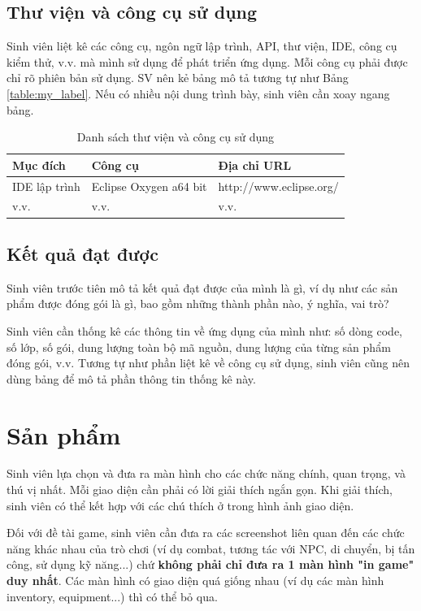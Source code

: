 \documentclass[../DoAn.tex]{subfiles}
\begin{document}
\subsection{Thư viện và công cụ sử dụng}
Sinh viên liệt kê các công cụ, ngôn ngữ lập trình, API, thư viện, IDE, công cụ kiểm thử, v.v. mà mình sử dụng để phát triển ứng dụng. Mỗi công cụ phải được chỉ rõ phiên bản sử dụng. SV nên kẻ bảng mô tả tương tự như Bảng \ref{table:my_label}. Nếu có nhiều nội dung trình bày, sinh viên cần xoay ngang bảng.

\begin{table}[H]
\centering{}
    \begin{tabular}{lll}
        \hline
        \textbf{Mục đích} & \textbf{Công cụ}       & \textbf{Địa chỉ URL}    \\ \hline
        IDE lập trình     & Eclipse Oxygen a64 bit & http://www.eclipse.org/ \\ \hline
        v.v.              & v.v.                   & v.v.                    \\ \hline
        \end{tabular}
    \caption{Danh sách thư viện và công cụ sử dụng}
    \label{fig:my_label}
\end{table}

\subsection{Kết quả đạt được}
Sinh viên trước tiên mô tả kết quả đạt được của mình là gì, ví dụ như các sản phẩm được đóng gói là gì, bao gồm những thành phần nào, ý nghĩa, vai trò?

Sinh viên cần thống kê các thông tin về ứng dụng của mình như: số dòng code, số lớp, số gói, dung lượng toàn bộ mã nguồn, dung lượng của từng sản phẩm đóng gói, v.v. Tương tự như phần liệt kê về công cụ sử dụng, sinh viên cũng nên dùng bảng để mô tả phần thông tin thống kê này.

\section{Sản phẩm}
Sinh viên lựa chọn và đưa ra màn hình cho các chức năng chính, quan trọng, và thú vị nhất. Mỗi giao diện cần phải có lời giải thích ngắn gọn. Khi giải thích, sinh viên có thể kết hợp với các chú thích ở trong hình ảnh giao diện.

Đối với đề tài game, sinh viên cần đưa ra các screenshot liên quan đến các chức năng khác nhau của trò chơi (ví dụ combat, tương tác với NPC, di chuyển, bị tấn công, sử dụng kỹ năng...) chứ \textbf{không phải chỉ đưa ra 1 màn hình "in game" duy nhất}. Các màn hình có giao diện quá giống nhau (ví dụ các màn hình inventory, equipment...) thì có thể bỏ qua. 
\end{document}
